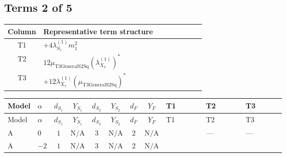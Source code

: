 \documentclass[8pt]{article}
\begin{document}
\begin{landscape}
\subsection*{Terms 2 of 5}
\begin{center}
\begin{tabular}{@{}c >{\raggedright\arraybackslash}p{0.82\linewidth}@{}}
\toprule
Column & Representative term structure \\
\midrule
T1 & \(\displaystyle +4 {\lambda_{S_1}^{(1)}} {m_1^2}\) \\
\midrule
T2 & \(\displaystyle 12 {\mu_{\mathrm{T3GeneralS2Sq}}} \left({\lambda_{X_{7}}^{(1)}}\right)^{*}\) \\
\midrule
T3 & \(\displaystyle +12 {\lambda_{X_{7}}^{(1)}} \left({\mu_{\mathrm{T3GeneralS2Sq}}}\right)^{*}\) \\
\midrule
\bottomrule
\end{tabular}
\end{center}
\smallskip
\tiny
\begin{longtable}{@{}llcccccc >{\raggedright\arraybackslash}p{0.21\linewidth} >{\raggedright\arraybackslash}p{0.21\linewidth} >{\raggedright\arraybackslash}p{0.21\linewidth}@{}}
\toprule
Model & $\alpha$ & $d_{S_1}$ & $Y_{S_1}$ & $d_{S_2}$ & $Y_{S_2}$ & $d_F$ & $Y_F$ & T1 & T2 & T3 \\
\midrule
\endfirsthead
\toprule
Model & $\alpha$ & $d_{S_1}$ & $Y_{S_1}$ & $d_{S_2}$ & $Y_{S_2}$ & $d_F$ & $Y_F$ & T1 & T2 & T3 \\
\midrule
\endhead
A & $0$ & $1$ & $\text{N/A}$ & $3$ & $\text{N/A}$ & $2$ & $\text{N/A}$ & \scriptsize\adjustbox{max width=\linewidth}{$\begin{gathered} +4 {\lambda_{S_1}^{(1)}} {m_1^2}\end{gathered}$} & --- & --- \\
\midrule
A & $-2$ & $1$ & $\text{N/A}$ & $3$ & $\text{N/A}$ & $2$ & $\text{N/A}$ & \scriptsize\adjustbox{max width=\linewidth}{$\begin{gathered} +4 {\lambda_{S_1}^{(1)}} {m_1^2}\end{gathered}$} & \scriptsize\adjustbox{max width=\linewidth}{$\begin{gathered} 12 {\mu_{\mathrm{T3GeneralS2Sq}}} \left({\lambda_{X_{7}}^{(1)}}\right)^{*}\end{gathered}$} & \scriptsize\adjustbox{max width=\linewidth}{$\begin{gathered} +12 {\lambda_{X_{7}}^{(1)}} \left({\mu_{\mathrm{T3GeneralS2Sq}}}\right)^{*}\end{gathered}$} \\

\end{longtable}
\end{landscape}
\end{document}
